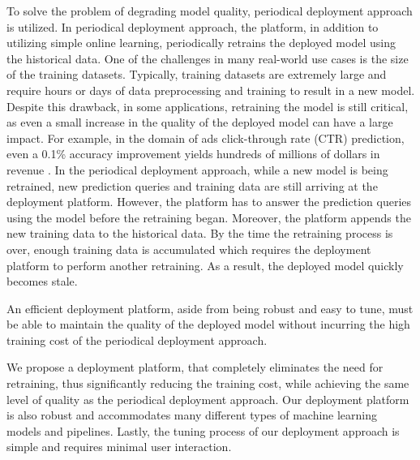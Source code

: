 To solve the problem of degrading model quality, periodical deployment approach is utilized.
In periodical deployment approach, the platform, in addition to utilizing simple online learning, periodically retrains the deployed model using the historical data.
One of the challenges in many real-world use cases is the size of the training datasets.
Typically, training datasets are extremely large and require hours or days of data preprocessing and training to result in a new model.
Despite this drawback, in some applications, retraining the model is still critical, as even a small increase in the quality of the deployed model can have a large impact.
For example, in the domain of ads click-through rate (CTR) prediction, even a 0.1\% accuracy improvement yields hundreds of millions of dollars in revenue \cite{ling2017model}.
In the periodical deployment approach, while a new model is being retrained, new prediction queries and training data are still arriving at the deployment platform.
However, the platform has to answer the prediction queries using the model before the retraining began.
Moreover, the platform appends the new training data to the historical data.
By the time the retraining process is over, enough training data is accumulated which requires the deployment platform to perform another retraining.
As a result, the deployed model quickly becomes stale.

An efficient deployment platform, aside from being robust and easy to tune, must be able to maintain the quality of the deployed model without incurring the high training cost of the periodical deployment approach.
 
We propose a deployment platform, that completely eliminates the need for retraining, thus significantly reducing the training cost, while achieving the same level of quality as the periodical deployment approach.
Our deployment platform is also robust and accommodates many different types of machine learning models and pipelines.
Lastly, the tuning process of our deployment approach is simple and requires minimal user interaction.


